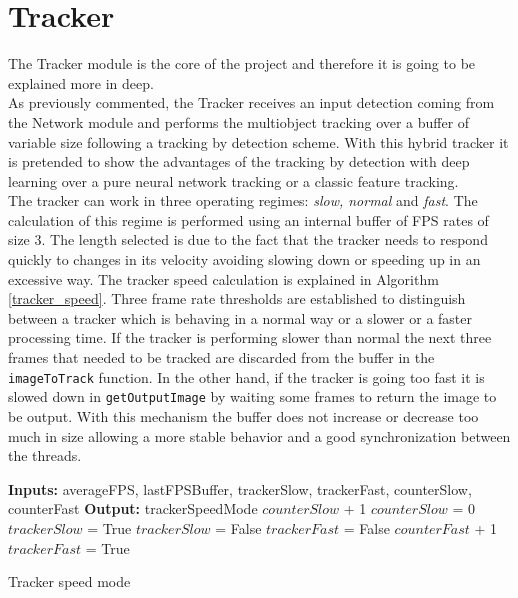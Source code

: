 \section{Tracker}
The Tracker module is the core of the project and therefore it is going to be explained more in deep.\\
As previously commented, the Tracker receives an input detection coming from the Network module and performs the multiobject tracking over a buffer of variable size following a tracking by detection scheme. With this hybrid tracker it is pretended to show the advantages of the tracking by detection with deep learning over a pure neural network tracking or a classic feature tracking.\\
The tracker can work in three operating regimes: \textit{slow, normal} and \textit{fast}. The calculation of this regime is performed using an internal buffer of FPS rates of size 3. The length selected is due to the fact that the tracker needs to respond quickly to changes in its velocity avoiding slowing down or speeding up in an excessive way. The tracker speed calculation is explained in Algorithm \ref{tracker_speed}. Three frame rate thresholds are established to distinguish between a tracker which is behaving in a normal way or a slower or a faster processing time. If the tracker is performing slower than normal the next three frames that needed to be tracked are discarded from the buffer in the \texttt{imageToTrack} function. In the other hand, if the tracker is going too fast it is slowed down in \texttt{getOutputImage} by waiting some frames to return the image to be output. With this mechanism the buffer does not increase or decrease too much in size allowing a more stable behavior and a good synchronization between the threads.

\begin{algorithmic}[H]
\begin{algorithm}
\State \textbf{Inputs:} averageFPS, lastFPSBuffer, trackerSlow, trackerFast, counterSlow, counterFast
\State \textbf{Output:} trackerSpeedMode
    \State $counterSlow$ + 1
        \State $counterSlow$ = 0
        \State $trackerSlow$ = True
    \EndIf
{}
    \State $trackerSlow$ = False
    \State $trackerFast$ = False
    \State $counterFast$ + 1
\State $trackerFast$ = True
\EndIf  
\EndProcedure
\caption{Tracker speed mode}\label{tracker_speed}
\end{algorithm}
\end{algorithmic}

